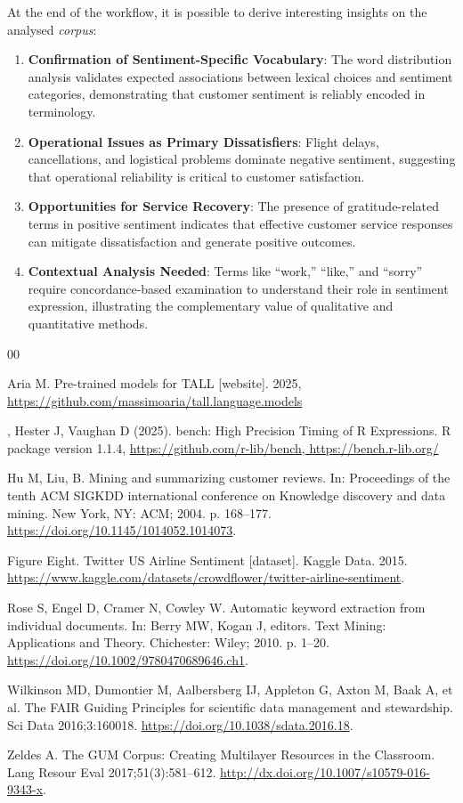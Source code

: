 \documentclass[8pt,a4paper]{article}
\begin{document}
At the end of the workflow, it is possible to derive interesting insights on the analysed \textit{corpus}:

\begin{enumerate}
    \item \textbf{Confirmation of Sentiment-Specific Vocabulary}: The word distribution analysis validates expected associations between lexical choices and sentiment categories, demonstrating that customer sentiment is reliably encoded in terminology.
    \item \textbf{Operational Issues as Primary Dissatisfiers}: Flight delays, cancellations, and logistical problems dominate negative sentiment, suggesting that operational reliability is critical to customer satisfaction.
    \item \textbf{Opportunities for Service Recovery}: The presence of gratitude-related terms in positive sentiment indicates that effective customer service responses can mitigate dissatisfaction and generate positive outcomes.
    \item \textbf{Contextual Analysis Needed}: Terms like ``work,'' ``like,'' and ``sorry'' require concordance-based examination to understand their role in sentiment expression, illustrating the complementary value of qualitative and quantitative methods.
\end{enumerate}

\begin{thebibliography}{00}

 Aria M. Pre-trained models for TALL [website]. 2025, \url{https://github.com/massimoaria/tall.language.models}

, Hester J, Vaughan D (2025). bench: High Precision Timing of R Expressions. R package version 1.1.4, \url{https://github.com/r-lib/bench, https://bench.r-lib.org/}

 Hu M, Liu, B. Mining and summarizing customer reviews. In: Proceedings of the tenth ACM SIGKDD international conference on Knowledge discovery and data mining.  New York, NY: ACM; 2004. p. 168–177. \url{https://doi.org/10.1145/1014052.1014073}.

 Figure Eight. Twitter US Airline Sentiment [dataset]. Kaggle Data. 2015. \url{https://www.kaggle.com/datasets/crowdflower/twitter-airline-sentiment}.

 Rose S, Engel D, Cramer N, Cowley W. Automatic keyword extraction from individual documents. In: Berry MW, Kogan J, editors. Text Mining: Applications and Theory. Chichester: Wiley; 2010. p. 1–20. \url{https://doi.org/10.1002/9780470689646.ch1}.

 Wilkinson MD, Dumontier M, Aalbersberg IJ, Appleton G, Axton M, Baak A, et al. The FAIR Guiding Principles for scientific data management and stewardship. Sci Data 2016;3:160018. \url{https://doi.org/10.1038/sdata.2016.18}.

 Zeldes A. The GUM Corpus: Creating Multilayer Resources in the Classroom. Lang Resour Eval 2017;51(3):581–612. \url{http://dx.doi.org/10.1007/s10579-016-9343-x}.

\end{thebibliography}
\end{document}
